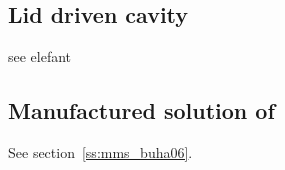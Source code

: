 \newpage
\subsection*{Lid driven cavity}

see elefant





\newpage
\subsection*{Manufactured solution of \textcite{buha06}}

See section~\ref{ss:mms_buha06}.

